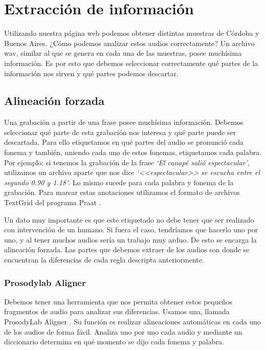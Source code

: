 \chapter{Extracción de información}

Utilizando nuestra página web podemos obtener distintas muestras de Córdoba y Buenos Aires. ¿Cómo podemos analizar estos audios correctamente? Un archivo wav, similar al que se genera en cada una de las muestras, posee muchísima información. Es por esto que debemos seleccionar correctamente qué partes de la información nos sirven y qué partes podemos descartar.

\section{Alineación forzada}

Una grabación a partir de una frase posee muchísima información. Debemos seleccionar qué parte de esta grabación nos interesa y qué parte puede ser descartada. Para ello etiquetamos en qué partes del audio se pronunció cada fonema y también, uniendo cada uno de estos fonemas, etiquetamos cada palabra. Por ejemplo: si tenemos la grabación de la frase \textit{`El canapé salió espectacular’}, utilizamos un archivo aparte que nos dice \textit{`<<espectacular>> se escucha entre el segundo 0.90 y 1.18’}. Lo mismo sucede para cada palabra y fonema de la grabación. Para marcar estas anotaciones utilizamos el formato de archivos TextGrid del programa Praat  \cite{praat}.

Un dato muy importante es que este etiquetado no debe tener que ser realizado con intervención de un humano. Si fuera el caso, tendríamos que hacerlo uno por uno, y al tener muchos audios sería un trabajo muy arduo. De esto se encarga la alineación forzada. Las partes que debemos extraer de los audios son donde se encuentran la diferencias de cada regla descripta anteriormente. 

\subsection{Prosodylab Aligner}


Debemos tener una herramienta que nos permita obtener estos pequeños fragmentos de audio para analizar sus diferencias. Usamos una, llamada ProsodyLab Aligner \cite{prosodylab}. Su función es realizar alineaciones automáticas en cada uno de los audios de forma fácil. Analiza uno por uno cada audio y mediante un diccionario determina en qué momento se dijo cada fonema y palabra. 

